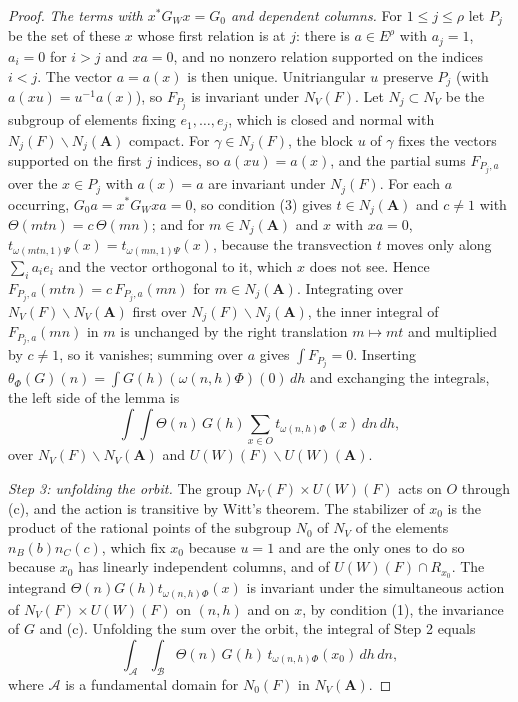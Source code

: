 \begin{proof}
\emph{The terms with $x^*G_Wx=G_0$ and dependent columns.} For $1\leq j\leq\rho$ let
$P_j$ be the set of these $x$ whose first relation is at $j$: there is $a\in E^\rho$
with $a_j=1$, $a_i=0$ for $i>j$ and $xa=0$, and no nonzero relation supported on
the indices $i<j$. The vector $a=a(x)$ is then unique. Unitriangular $u$
preserve $P_j$ (with $a(xu)=u^{-1}a(x)$), so $F_{P_j}$ is invariant under
$N_V(F)$. Let $N_j\subset N_V$ be the subgroup of elements fixing
$e_1,\ldots,e_j$, which is closed and normal with $N_j(F)\backslash N_j(\mathbf A)$
compact. For $\gamma\in N_j(F)$, the block $u$ of $\gamma$ fixes the vectors
supported on the first $j$ indices, so $a(xu)=a(x)$, and the partial sums
$F_{P_j,a}$ over the $x\in P_j$ with $a(x)=a$ are invariant under $N_j(F)$.
For each $a$ occurring, $G_0a=x^*G_Wxa=0$, so condition (3) gives $t\in N_j(\mathbf A)$
and $c\neq1$ with $\Theta(mtn)=c\,\Theta(mn)$; and for $m\in N_j(\mathbf A)$
and $x$ with $xa=0$, $t_{\omega(mtn,1)\Psi}(x)=t_{\omega(mn,1)\Psi}(x)$, because
the transvection $t$ moves only along $\sum_ia_ie_i$ and the vector orthogonal
to it, which $x$ does not see. Hence $F_{P_j,a}(mtn)=c\,F_{P_j,a}(mn)$ for
$m\in N_j(\mathbf A)$. Integrating over $N_V(F)\backslash N_V(\mathbf A)$ first
over $N_j(F)\backslash N_j(\mathbf A)$, the inner integral of $F_{P_j,a}(mn)$ in
$m$ is unchanged by the right translation $m\mapsto mt$ and multiplied by
$c\neq1$, so it vanishes; summing over $a$ gives $\int F_{P_j}=0$.
Inserting $\theta_\Phi(G)(n)=\int G(h)(\omega(n,h)\Phi)(0)\,dh$ and exchanging
the integrals, the left side of the lemma is
\[
\int\!\!\int\Theta(n)\,G(h)\sum_{x\in O}t_{\omega(n,h)\Phi}(x)\,dn\,dh,
\]
over $N_V(F)\backslash N_V(\mathbf A)$ and $U(W)(F)\backslash U(W)(\mathbf A)$.

\emph{Step 3: unfolding the orbit.} The group $N_V(F)\times U(W)(F)$ acts on
$O$ through (c), and the action is transitive by Witt's theorem. The stabilizer
of $x_0$ is the product of the rational points of the subgroup $N_0$ of $N_V$
of the elements $n_B(b)n_C(c)$, which fix $x_0$ because $u=1$ and are the only
ones to do so because $x_0$ has linearly independent columns, and of
$U(W)(F)\cap R_{x_0}$. The integrand
$\Theta(n)G(h)t_{\omega(n,h)\Phi}(x)$ is invariant under the simultaneous
action of $N_V(F)\times U(W)(F)$ on $(n,h)$ and on $x$, by condition (1), the
invariance of $G$ and (c). Unfolding the sum over the orbit, the integral of
Step 2 equals
\[
\int_{\mathcal A}\int_{\mathcal B}\Theta(n)\,G(h)\,t_{\omega(n,h)\Phi}(x_0)\,dh\,dn,
\]
where $\mathcal A$ is a fundamental domain for $N_0(F)$ in $N_V(\mathbf A)$.


\end{proof}
